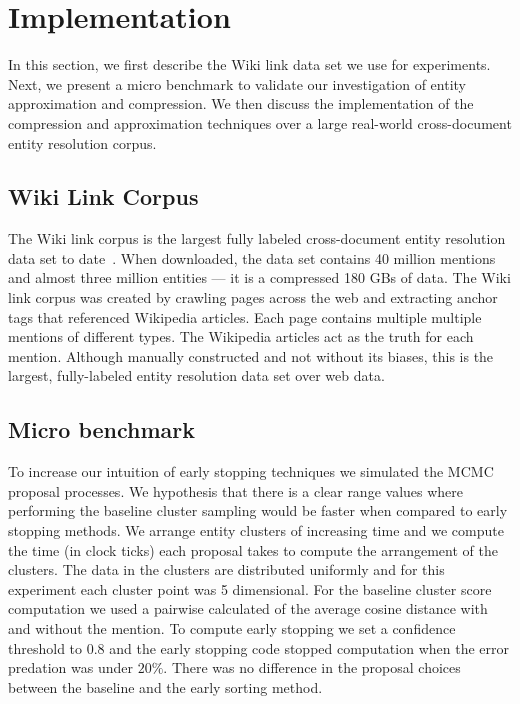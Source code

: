 
\section{Implementation}
\label{sec:optimizer:implementation}

In this section, we first describe the Wiki link data set we use for experiments.
Next, we present a micro benchmark to validate our investigation of entity approximation and compression.
We then discuss the implementation of the compression and approximation techniques over a large real-world
cross-document entity resolution corpus.

\subsection{Wiki Link Corpus}
\label{sec:optimizer:wikilinkcorpus}

The Wiki link corpus is the largest fully labeled cross-document entity resolution data set to date~\cite{singh12:wiki-links}.
When downloaded, the data set contains 40 million mentions and almost three million entities --- it is a compressed 180 GBs of data.
The Wiki link corpus was created by crawling pages across the web and extracting anchor tags that referenced Wikipedia articles.
Each page contains multiple multiple mentions of different types.
The Wikipedia articles act as the truth for each mention.
Although manually constructed and not without its biases, this is the largest,
fully-labeled entity resolution data set over web data.


\subsection{Micro benchmark}
\label{sec:microbenchmark}
To increase our intuition of early stopping techniques we simulated the MCMC proposal processes. 
We hypothesis that there is a clear range values where performing the
baseline cluster sampling would be faster when compared to early stopping methods.
We arrange entity clusters of increasing time and we compute the time (in clock ticks)
each proposal takes to compute the arrangement of the clusters.
The data in the clusters are distributed uniformly and for this experiment each cluster point
was 5 dimensional.
For the baseline cluster score computation we used a pairwise calculated of the average cosine distance
with and without the mention.
To compute early stopping we set a confidence threshold to $0.8$ and the early
stopping code stopped computation when the error predation was under $20\%$.
There was no difference in the proposal choices between the baseline and the early sorting method. 

